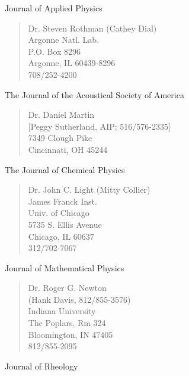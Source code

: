 \noindent      Journal of Applied Physics

\begin{verse}
             Dr. Steven Rothman (Cathey Dial)\\
             Argonne Natl. Lab.\\
             P.O. Box 8296\\
             Argonne, IL  60439-8296\\
             708/252-4200\\
\end{verse}

\noindent      The Journal of the Acoustical Society of America

\begin{verse}
             Dr. Daniel Martin\\
             $[$Peggy Sutherland, AIP; 516/576-2335$]$\\
             7349 Clough Pike\\
             Cincinnati, OH  45244\\

\end{verse}
\newpage
\noindent      The Journal of Chemical Physics

\begin{verse}
             Dr. John C. Light (Mitty Collier)\\
             James Franck Inst.\\
             Univ. of Chicago\\
             5735 S. Ellis Avenue\\
             Chicago, IL  60637\\
             312/702-7067\\
\end{verse}


\noindent      Journal of Mathematical Physics

\begin{verse}
             Dr. Roger G. Newton\\
             (Hank Davis, 812/855-3576)\\
             Indiana University\\
             The Poplars, Rm 324\\
             Bloomington, IN  47405\\
             812/855-2095\\
\end{verse}

\noindent      Journal of Rheology

